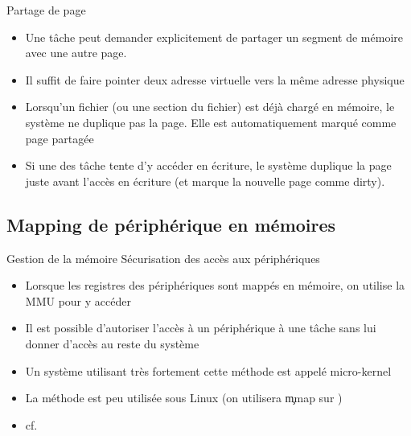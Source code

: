 \begin{frame}[fragile=singleslide]{Partage de page}
  \begin{itemize}
  \item Une  tâche peut demander explicitement de  partager un segment
    de mémoire avec une autre page.
  \item Il  suffit de  faire pointer deux  adresse virtuelle  vers la
    même adresse physique
  \item Lorsqu'un fichier (ou une  section du fichier) est déjà chargé
    en  mémoire,  le  système  ne  duplique  pas  la  page.  Elle  est
    automatiquement marqué comme page partagée
  \item Si  une des  tâche tente d'y  accéder en écriture,  le système
    duplique la  page juste  avant l'accès en  écriture (et  marque la
    nouvelle page comme dirty).
  \end{itemize}
\end{frame}

\subsection{Mapping de périphérique en mémoires}

\begin{frame}{Gestion de la mémoire}
  Sécurisation des accès aux périphériques
  \begin{itemize}
  \item  Lorsque  les  registres  des  périphériques  sont  mappés  en
    mémoire, on utilise la MMU pour y accéder
  \item Il  est possible d'autoriser  l'accès à un périphérique  à une
    tâche sans lui donner d'accès au reste du système
  \item Un système utilisant  très fortement cette méthode est appelé
    micro-kernel
  \item La méthode est peu  utilisée sous Linux (on utilisera \c{mmap}
    sur )
  \item cf. 
  \end{itemize}
\end{frame}

